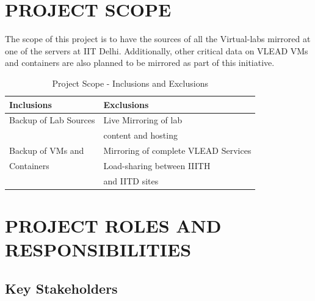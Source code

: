 \documentclass[11pt]{article}
\begin{document}
\section{PROJECT SCOPE}
\label{sec-4}


 The scope of this project is to have the sources of all the
Virtual-labs mirrored at one of the servers at IIT
Delhi. Additionally, other critical data on VLEAD VMs and containers
are also planned to be mirrored as part of this initiative.


\begin{table}[H]
\caption{\label{tbl:Inclusions and Exclusions}Project Scope - Inclusions and Exclusions}
\begin{center}
\begin{tabular}{ll}
\hline
 Inclusions             &  Exclusions                            \\
\hline
 Backup of Lab Sources  &  Live Mirroring of lab                 \\
                        &  content and hosting                   \\
 Backup of VMs and      &  Mirroring of complete VLEAD Services  \\
 Containers             &  Load-sharing between IIITH            \\
                        &  and IITD sites                        \\
\hline
\end{tabular}
\end{center}
\end{table}

\section{PROJECT ROLES AND RESPONSIBILITIES}
\label{sec-5}

\subsection{Key Stakeholders}
\label{sec-5.1}
\end{document}
